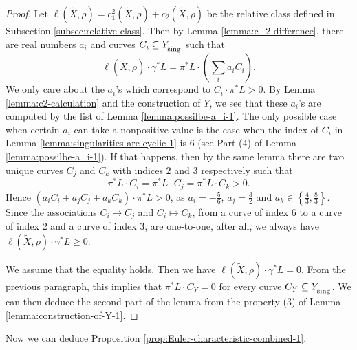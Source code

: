 \documentclass[12pt]{amsart}
\newcommand{\<}{\leq}
\def\>{\geq}
\def\subset{\subseteq}
\theoremstyle{remark}
\theoremstyle{definition}
\theoremstyle{definition}
\numberwithin{equation}{section}
\theoremstyle{definition}
\theoremstyle{definition}
\def\sing{\operatorname{\textsubscript{\rm sing}}}
\begin{document}
\begin{proof}
Let $\ell(\widetilde{X}, \rho) = c_1^2(\widetilde{X}, \rho) + c_2(\widetilde{X}, \rho)$ be the  relative class defined in Subsection \ref{subsec:relative-class}. 
Then by Lemma \ref{lemma:c_2-difference},  there are real numbers $a_i$ and curves $C_i\subseteq Y_{\sing}$ such that 
\[ \ell(\widetilde{X}, \rho) \cdot \gamma^*L = \pi^*L\cdot \left(\sum_i a_iC_i\right).\]
We only care about the $a_i$'s which correspond to $C_i\cdot \pi^*L >0$. 
By Lemma \ref{lemma:c2-calculation} and the construction of $Y$, we see that these $a_i$'s are computed by the list of Lemma \ref{lemma:possilbe-a_i-1}. 
The only possible case when certain $a_i$ can take a nonpositive value is the case when the index of  $C_i$ in Lemma \ref{lemma:singularities-are-cyclic-1} is $6$ (see Part (4) of Lemma \ref{lemma:possilbe-a_i-1}). 
If that happens, then by the same lemma there are two unique curves $C_j$ and $C_k$ with indices $2$ and $3$ respectively such that 
\[ \pi^*L\cdot C_i=\pi^*L\cdot C_j=\pi^*L\cdot C_k>0. \] 
Hence $(a_iC_i+a_jC_j+a_kC_k)\cdot \pi^*L  >0$, as $a_i=-\frac 56$, $a_j=\frac 32$ and $a_k\in\left\{\frac 43, \frac 83\right\}$. 
Since the associations $C_i \mapsto C_j$ and $C_i\mapsto C_k$, from a curve of index 6 to a curve of index 2 and a curve of index 3, are one-to-one, 
after all, we always have  $\ell(\widetilde{X}, \rho) \cdot \gamma^*L \> 0$.  

We assume that the equality holds. 
Then we have  $\ell(\widetilde X, \rho)\cdot\gamma^*L=0$. 
From the previous paragraph, this implies that  $\pi^*L\cdot C_Y=0$ for every curve $C_Y\subset Y_{\sing}$. 
We can then deduce the second part of the lemma from  the property (3) of Lemma \ref{lemma:construction-of-Y-1}.
\end{proof} 


 
Now we can deduce Proposition \ref{prop:Euler-characteristic-combined-1}.
\end{document}

